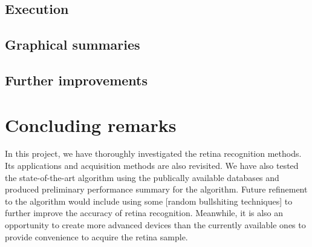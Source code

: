 \documentclass[a4paper,11pt]{article}
\theoremstyle{plain} %
\begin{document}
\subsection{Execution}

\subsection{Graphical summaries}

\subsection{Further improvements}


\section{Concluding remarks}
In this project, we have thoroughly investigated the retina recognition methods. Its applications and acquisition methods are also revisited. We have also tested the state-of-the-art algorithm using the publically available databases and produced preliminary performance summary for the algorithm. Future refinement to the algorithm would include using some [random bullshiting techniques] to further improve the accuracy of retina recognition. Meanwhile, it is also an opportunity to create more advanced devices than the currently available ones to provide convenience to acquire the retina sample.




\end{document}

